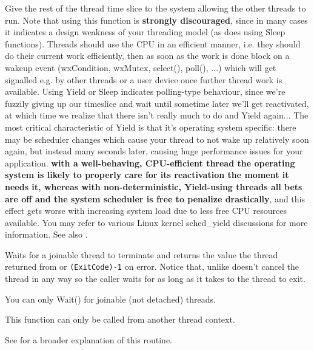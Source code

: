 Give the rest of the thread time slice to the system allowing the other threads to run.
Note that using this function is {\bf strongly discouraged}, since in
many cases it indicates a design weakness of your threading model (as
does using Sleep functions).
Threads should use the CPU in an efficient manner, i.e. they should
do their current work efficiently, then as soon as the work is done block
on a wakeup event (wxCondition, wxMutex, select(), poll(), ...)
which will get signalled e.g. by other threads or a user device once further
thread work is available. Using Yield or Sleep
indicates polling-type behaviour, since we're fuzzily giving up our timeslice
and wait until sometime later we'll get reactivated, at which time we
realize that there isn't really much to do and Yield again...
The most critical characteristic of Yield is that it's operating system
specific: there may be scheduler changes which cause your thread to not
wake up relatively soon again, but instead many seconds later,
causing huge performance issues for your application. {\bf with a
well-behaving, CPU-efficient thread the operating system is likely to properly
care for its reactivation the moment it needs it, whereas with
non-deterministic, Yield-using threads all bets are off and the system
scheduler is free to penalize drastically}, and this effect gets worse
with increasing system load due to less free CPU resources available.
You may refer to various Linux kernel sched\_yield discussions for more information.
See also .


\label{wxthreadwait}


Waits for a joinable thread to terminate and returns the value the thread
returned from  or {\tt (ExitCode)-1} on
error. Notice that, unlike  doesn't cancel the
thread in any way so the caller waits for as long as it takes to the thread to
exit.

You can only Wait() for joinable (not detached) threads.

This function can only be called from another thread context.

See  for a broader explanation of this routine.

